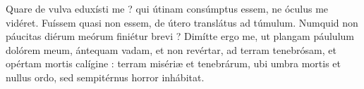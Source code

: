 \lettrine{Q}{}uare de vulva eduxísti me ? qui útinam consúmptus essem, ne óculus me vidéret.
Fuíssem quasi non essem, de útero translátus ad túmulum.
Numquid non páucitas diérum meórum finiétur brevi ? Dimítte ergo me, ut plangam páululum dolórem meum,
ántequam vadam, et non revértar, ad terram tenebrósam, et opértam mortis calígine :
terram misériæ et tenebrárum, ubi umbra mortis et nullus ordo, sed sempitérnus horror inhábitat.
